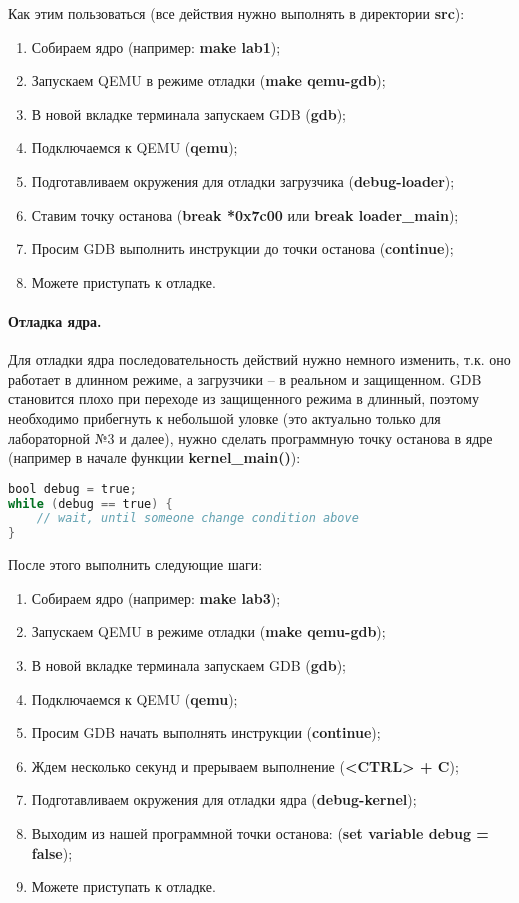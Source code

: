 Как этим пользоваться (все действия нужно выполнять в директории \textbf{src}):
\begin{enumerate}[1.]
\item Собираем ядро (например: \textbf{make lab1});
\item Запускаем QEMU в режиме отладки (\textbf{make qemu-gdb});
\item В новой вкладке терминала запускаем GDB (\textbf{gdb});
\item Подключаемся к QEMU (\textbf{qemu});
\item Подготавливаем окружения для отладки загрузчика (\textbf{debug-loader});
\item Ставим точку останова (\textbf{break *0x7c00} или \textbf{break loader\_main});
\item Просим GDB выполнить инструкции до точки останова (\textbf{continue});
\item Можете приступать к отладке.
\end{enumerate}

\paragraph{Отладка ядра.} Для отладки ядра последовательность действий нужно
немного изменить, т.к. оно работает в длинном режиме, а загрузчики -- в
реальном и защищенном. GDB становится плохо при переходе из защищенного режима
в длинный, поэтому необходимо прибегнуть к небольшой уловке (это актуально
только для лабораторной №3 и далее), нужно сделать программную точку останова
в ядре (например в начале функции \textbf{kernel\_main()}):

\begin{lstlisting}[language=C]
bool debug = true;
while (debug == true) {
	// wait, until someone change condition above
}
\end{lstlisting}

После этого выполнить следующие шаги:
\begin{enumerate}[1.]
\item Собираем ядро (например: \textbf{make lab3});
\item Запускаем QEMU в режиме отладки (\textbf{make qemu-gdb});
\item В новой вкладке терминала запускаем GDB (\textbf{gdb});
\item Подключаемся к QEMU (\textbf{qemu});
\item Просим GDB начать выполнять инструкции (\textbf{continue});
\item Ждем несколько секунд и прерываем выполнение (\textbf{<CTRL> + C});
\item Подготавливаем окружения для отладки ядра (\textbf{debug-kernel});
\item Выходим из нашей программной точки останова: (\textbf{set variable debug = false});
\item Можете приступать к отладке.
\end{enumerate}

